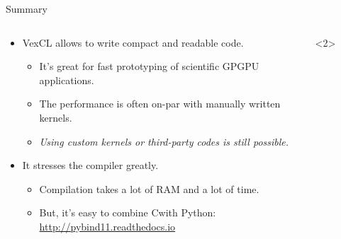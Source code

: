 \documentclass[@BEAMER_OPTIONS@]{beamer}
\newcommand{\CXX}{{\rm C}\plusplus}
\newcommand{\www}[1]{\href{#1}{#1}}
\begin{document}
\begin{frame}[fragile]{Summary}
    \begin{columns}
        \begin{column}{0.65\textwidth}
            \begin{itemize}
                \item VexCL allows to write compact and readable code.
                    \begin{itemize}
                        \item It's great for fast prototyping of scientific
                            GPGPU applications.
                            \vspace{0.5\baselineskip}
                        \item The performance is often on-par with manually
                            written kernels.
                            \vspace{0.5\baselineskip}
                        \item \emph{Using custom kernels or third-party codes is
                            still possible.}
                    \end{itemize}
                    \vspace{\baselineskip}
                    \pause
                \item It stresses the compiler greatly.
                    \begin{itemize}
                        \item Compilation takes a lot of RAM and a lot of
                            time.
                        \item But, it's easy to combine \CXX with Python:
                            \www{http://pybind11.readthedocs.io}
                    \end{itemize}
            \end{itemize}
        \end{column}
        \begin{column}{0.3\textwidth}
            \begin{uncoverenv}<2>
                \begin{figure}

\end{figure}
\end{uncoverenv}
\end{column}
\end{columns}
\end{frame}
\end{document}
